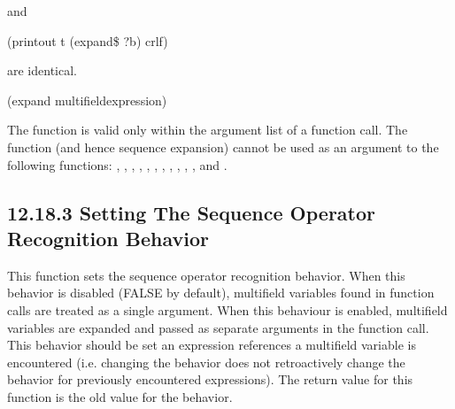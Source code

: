\documentclass[letterpaper,10pt,english]{sphinxmanual}
\begin{document}
and

(printout t (expand\$ ?b) crlf)

are identical.


\begin{sphinxVerbatim}[commandchars=\\\{\}]
(expand\PYGZdl{} \PYGZlt{}multifield\PYGZhy{}expression\PYGZgt{})
\end{sphinxVerbatim}

The  function is valid only within the argument list of a
function call. The  function (and hence sequence expansion)
cannot be used as an argument to the following functions: ,
, , , , , ,
, , , , 
and .


\subsection{12.18.3 Setting The Sequence Operator Recognition Behavior}
\label{\detokenize{actions:setting-the-sequence-operator-recognition-behavior}}
This function sets the sequence operator recognition behavior. When this
behavior is disabled (FALSE by default), multifield variables found in
function calls are treated as a single argument. When this behaviour is
enabled, multifield variables are expanded and passed as separate
arguments in the function call. This behavior should be set  an
expression references a multifield variable is encountered (i.e.
changing the behavior does not retroactively change the behavior for
previously encountered expressions). The return value for this function
is the old value for the behavior.


\begin{sphinxVerbatim}[commandchars=\\\{\}]
 
\end{sphinxVerbatim}
\end{document}
